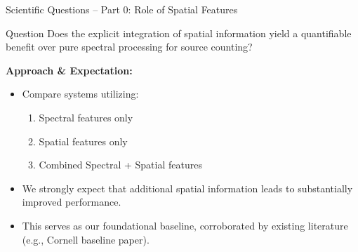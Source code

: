 \documentclass[8pt,hyperref={pdfpagelabels=true},xcolor=table,aspectratio=169]{beamer}
\begin{document}
\begin{frame}{Scientific Questions -- Part 0: Role of Spatial Features}
    \begin{block}{Question}
        Does the explicit integration of spatial information yield a quantifiable benefit over pure spectral processing for source counting?
    \end{block}
    \vspace{1em}
    \textbf{Approach \& Expectation:}
    \begin{itemize}
        \item Compare systems utilizing:
              \begin{enumerate}
                  \item Spectral features only
                  \item Spatial features only
                  \item Combined Spectral + Spatial features
              \end{enumerate}
        \item We strongly expect that additional spatial information leads to substantially improved performance.
        \item This serves as our foundational baseline, corroborated by existing literature (e.g., Cornell baseline paper).
    \end{itemize}
\end{frame}
\end{document}

